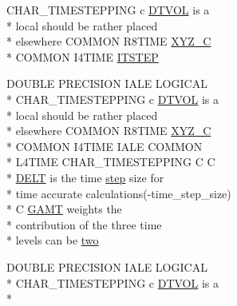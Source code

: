 \begin{DoxyCompactItemize}
C\-H\-A\-R\-\_\-\-T\-I\-M\-E\-S\-T\-E\-P\-P\-I\-N\-G c \hyperlink{msa20_2home_2abonfi_2_c_f_d__codes_2_eul_f_s_83_82_83_2include_2time_8com_a00486054a38d678ac27310774f9c3d36}{D\-T\-V\-O\-L} is a \\*
local should be rather placed \\*
elsewhere C\-O\-M\-M\-O\-N R8\-T\-I\-M\-E \hyperlink{home_2abonfi_2_c_f_d__codes_2_eul_f_s_83_84_2include_2time_8com_aea163e1b1768adcd9e1f052e8e713145}{X\-Y\-Z\-\_\-\-C} \\*
C\-O\-M\-M\-O\-N I4\-T\-I\-M\-E \hyperlink{home_2abonfi_2_c_f_d__codes_2_eul_f_s_83_84_2include_2time_8com_a11b72cddc58a44173ab90b066363ce9c}{I\-T\-S\-T\-E\-P}
\item 
D\-O\-U\-B\-L\-E P\-R\-E\-C\-I\-S\-I\-O\-N I\-A\-L\-E L\-O\-G\-I\-C\-A\-L \\*
C\-H\-A\-R\-\_\-\-T\-I\-M\-E\-S\-T\-E\-P\-P\-I\-N\-G c \hyperlink{msa20_2home_2abonfi_2_c_f_d__codes_2_eul_f_s_83_82_83_2include_2time_8com_a00486054a38d678ac27310774f9c3d36}{D\-T\-V\-O\-L} is a \\*
local should be rather placed \\*
elsewhere C\-O\-M\-M\-O\-N R8\-T\-I\-M\-E \hyperlink{home_2abonfi_2_c_f_d__codes_2_eul_f_s_83_84_2include_2time_8com_aea163e1b1768adcd9e1f052e8e713145}{X\-Y\-Z\-\_\-\-C} \\*
C\-O\-M\-M\-O\-N I4\-T\-I\-M\-E I\-A\-L\-E C\-O\-M\-M\-O\-N \\*
L4\-T\-I\-M\-E C\-H\-A\-R\-\_\-\-T\-I\-M\-E\-S\-T\-E\-P\-P\-I\-N\-G C C \\*
\hyperlink{msa20_2home_2abonfi_2_c_f_d__codes_2_eul_f_s_83_82_83_2include_2time_8com_acb1f2f1a9ae66911a5f4605d8be61030}{D\-E\-L\-T} is the time \hyperlink{home_2abonfi_2_c_f_d__codes_2_eul_f_s_83_84_2include_2time_8com_a3afa77097ad8466eb34858ba6f60aad2}{step} size for \\*
time accurate calculations(-\/time\-\_\-step\-\_\-size) \\*
C \hyperlink{msa20_2home_2abonfi_2_c_f_d__codes_2_eul_f_s_83_82_83_2include_2time_8com_a13b288a3cbd362cd91ab8edbfe0c08ee}{G\-A\-M\-T} weights the \\*
contribution of the three time \\*
levels can be \hyperlink{home_2abonfi_2_c_f_d__codes_2_eul_f_s_83_84_2include_2time_8com_aff9d488c2e656631c4112588122f2417}{two}
\item 
D\-O\-U\-B\-L\-E P\-R\-E\-C\-I\-S\-I\-O\-N I\-A\-L\-E L\-O\-G\-I\-C\-A\-L \\*
C\-H\-A\-R\-\_\-\-T\-I\-M\-E\-S\-T\-E\-P\-P\-I\-N\-G c \hyperlink{msa20_2home_2abonfi_2_c_f_d__codes_2_eul_f_s_83_82_83_2include_2time_8com_a00486054a38d678ac27310774f9c3d36}{D\-T\-V\-O\-L} is a \\*

\end{DoxyCompactItemize}

